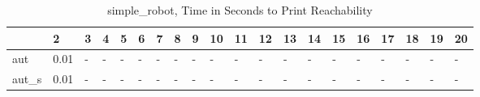 \begin{table}
\caption{simple_robot, Time in Seconds to Print Reachability}
\label{simple_robot_states_time}
\begin{tabular}{llllllllllllllllllll}
\toprule
 & 2 & 3 & 4 & 5 & 6 & 7 & 8 & 9 & 10 & 11 & 12 & 13 & 14 & 15 & 16 & 17 & 18 & 19 & 20 \\
\midrule
aut & 0.01 & - & - & - & - & - & - & - & - & - & - & - & - & - & - & - & - & - & - \\
aut_s & 0.01 & - & - & - & - & - & - & - & - & - & - & - & - & - & - & - & - & - & - \\
\bottomrule
\end{tabular}
\end{table}
